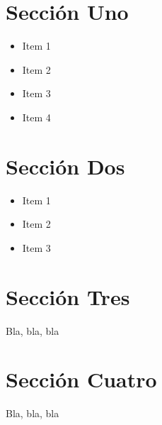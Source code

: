 
\section{Sección Uno}
\label{1:sec:1}

\begin{itemize}
  \item Item 1
  \item Item 2
  \item Item 3
  \item Item 4
\end{itemize}

\section{Sección Dos}
\label{1:sec:2}

\begin{itemize}
  \item Item 1
  \item Item 2
  \item Item 3
\end{itemize}

\section{Sección Tres}
\label{1:sec:3}

Bla, bla, bla

\section{Sección Cuatro}
\label{1:sec:4}

Bla, bla, bla

